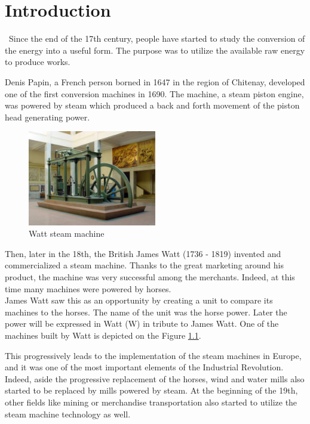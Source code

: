 \graphicspath{{Chapitre_2/Images/}}
\chapter{Introduction}\label{introduction}
\setlength{\headheight}{52pt}    
\quad\, Since the end of the 17th century, people have started to study the conversion of the energy into a useful form. The purpose was to utilize the available raw energy to produce works.

Denis Papin, a French person borned in 1647 in the region of Chitenay, developed one of the first conversion machines in 1690. The machine, a steam piston engine, was powered by steam which produced a back and forth movement of the piston head generating power. 

\begin{figure}[h]
    \centering
    \includegraphics[width=0.5\textwidth]{Chapitre_1/Images/Maquina_vapor_Watt_ETSIIM.jpg}
    \caption{Watt steam machine\cite{Watt}}
    \label{fig:Watt}
\end{figure}

Then, later in the 18th, the British James Watt (1736 - 1819) invented and commercialized a steam machine. Thanks to the great marketing around his product, the machine was very successful among the merchants. Indeed, at this time many machines were powered by horses.\\

James Watt saw this as an opportunity by creating a unit to compare its machines to the horses. The name of the unit was the horse power. Later the power will be expressed in Watt (W) in tribute to James Watt. One of the machines built by Watt is depicted on the Figure \ref{fig:Watt}.

This progressively leads to the implementation of the steam machines in Europe, and it was one of the most important elements of the Industrial Revolution. Indeed, aside the progressive replacement of the horses, wind and water mills also started to be replaced by mills powered by steam. At the beginning of the 19th, other fields like mining or merchandise transportation also started to utilize the steam machine technology as well.

